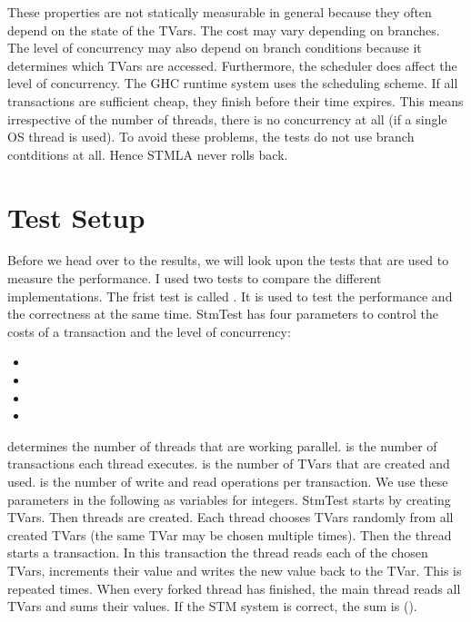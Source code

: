 These properties are not statically measurable in general because they often depend on the state of the TVars. 
The cost may vary depending on branches. The level of concurrency may also 
depend on branch conditions because it determines which TVars are accessed. Furthermore,
the scheduler does affect the level of concurrency. The GHC runtime system uses the 
scheduling scheme. If all transactions are sufficient cheap, they finish before their time expires.
This means irrespective of the number of threads, there is no concurrency at all (if a single OS thread
is used). To avoid these problems, the tests do not use branch contditions at all. Hence STMLA never rolls back.

\section{Test Setup}
Before we head over to the results, we will look upon the tests that are used to measure the performance.
I used two tests to compare the different implementations. The frist test is called .
It is used to test the performance and the correctness at the same time. StmTest has four parameters to control
the costs of a transaction and the level of concurrency:
\begin{itemize}
 \item {}
 \item {}
 \item {}
 \item {}
\end{itemize}
 determines the number of threads that are working parallel.  is the number of transactions
each thread executes.  is the number of TVars that are created and used.  is the number of write
and read operations per transaction. We use these parameters in the following as variables for integers.
StmTest starts by creating  TVars. Then  threads are created. Each thread chooses  TVars randomly from all 
created TVars (the same TVar may be chosen multiple times). Then the thread starts a transaction. In this transaction the thread reads each of the chosen 
TVars, increments their value and writes the new value back to the TVar. This is repeated  times. When every forked thread has finished, the
main thread reads all TVars and sums their values. If the STM system is correct, the sum is ().

